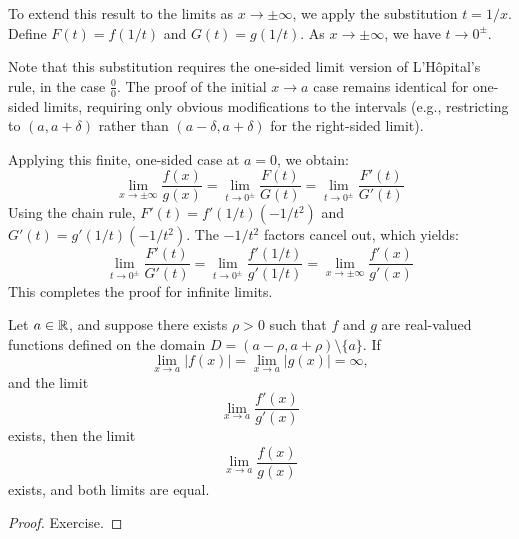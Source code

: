 \documentclass[../analysis1.tex]{subfiles}
\begin{document}
\begin{remark}
    To extend this result to the limits as $x\to\pm\infty$, we apply the substitution $t = 1/x$. Define $F(t) = f(1/t)$ and $G(t) = g(1/t)$. As $x \to \pm\infty$, we have $t \to 0^\pm$. 
    
    Note that this substitution requires the one-sided limit version of L'H\^opital's rule, in the case $\frac{0}{0}$. The proof of the initial $x \to a$ case remains identical for one-sided limits, requiring only obvious modifications to the intervals (e.g., restricting to $(a, a+\delta)$ rather than $(a-\delta, a+\delta)$ for the right-sided limit).
    
    Applying this finite, one-sided case at $a=0$, we obtain:
    $$\lim_{x\to\pm\infty} \frac{f(x)}{g(x)} = \lim_{t\to 0^\pm} \frac{F(t)}{G(t)} = \lim_{t\to 0^\pm} \frac{F'(t)}{G'(t)}$$
    Using the chain rule, $F'(t) = f'(1/t)(-1/t^2)$ and $G'(t) = g'(1/t)(-1/t^2)$. The $-1/t^2$ factors cancel out, which yields:
    $$\lim_{t\to 0^\pm} \frac{F'(t)}{G'(t)} = \lim_{t\to 0^\pm} \frac{f'(1/t)}{g'(1/t)} = \lim_{x\to\pm\infty} \frac{f'(x)}{g'(x)}$$
    This completes the proof for infinite limits.
\end{remark}

\begin{theorem}
    \begin{shaded*}
        Let $a \in \mathbb{R}$, and suppose there exists $\rho > 0$ such that $f$ and $g$ are real-valued functions defined on the domain $D = (a - \rho, a + \rho) \setminus \{a\}$. If \[\lim_{x\to a}|f(x)|=\lim_{x\to a}|g(x)|=\infty,\]
        and the limit \[\lim_{x\to a}\frac{f'(x)}{g'(x)}\]
        exists, then the limit \[\lim_{x\to a}\frac{f(x)}{g(x)}\]
        exists, and both limits are equal.
    \end{shaded*}
\end{theorem}
\begin{proof}
    Exercise.\qedhere
\end{proof}
\end{document}
